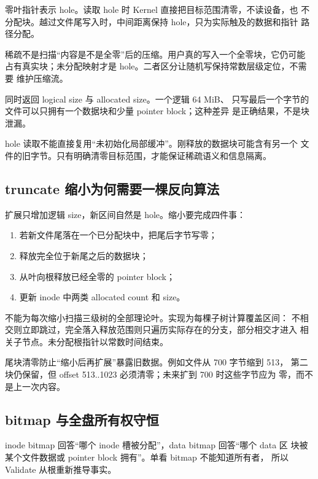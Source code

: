 零叶指针表示 hole。读取 hole 时 Kernel 直接把目标范围清零，不读设备，也
不分配块。越过文件尾写入时，中间距离保持 hole，只为实际触及的数据和指针
路径分配。

稀疏不是扫描“内容是不是全零”后的压缩。用户真的写入一个全零块，它仍可能
占有真实块；未分配映射才是 hole。二者区分让随机写保持常数层级定位，不需要
维护压缩流。

 同时返回 logical size 与 allocated size。一个逻辑 64 MiB、
只写最后一个字节的文件可以只拥有一个数据块和少量 pointer block；这种差异
是正确结果，不是块泄漏。

\begin{failurebox}
hole 读取不能直接复用“未初始化局部缓冲”。刚释放的数据块可能含有另一个
文件的旧字节。只有明确清零目标范围，才能保证稀疏语义和信息隔离。
\end{failurebox}

\subsection{truncate 缩小为何需要一棵反向算法}

扩展只增加逻辑 size，新区间自然是 hole。缩小要完成四件事：

\begin{enumerate}
  \item 若新文件尾落在一个已分配块中，把尾后字节写零；
  \item 释放完全位于新尾之后的数据块；
  \item 从叶向根释放已经全零的 pointer block；
  \item 更新 inode 中两类 allocated count 和 size。
\end{enumerate}

不能为每次缩小扫描三级树的全部理论叶。实现为每棵子树计算覆盖区间：
不相交则立即跳过，完全落入释放范围则只遍历实际存在的分支，部分相交才进入
相关子节点。未分配根指针以常数时间结束。

尾块清零防止“缩小后再扩展”暴露旧数据。例如文件从 700 字节缩到 513，
第二块仍保留，但 offset 513..1023 必须清零；未来扩到 700 时这些字节应为
零，而不是上一次内容。

\subsection{bitmap 与全盘所有权守恒}

inode bitmap 回答“哪个 inode 槽被分配”，data bitmap 回答“哪个 data 区
块被某个文件数据或 pointer block 拥有”。单看 bitmap 不能知道所有者，
所以 Validate 从根重新推导事实。

